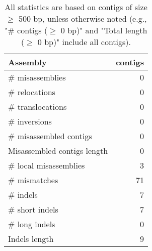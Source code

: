 \documentclass[12pt,a4paper]{article}
\begin{document}
\begin{table}[ht]
\begin{center}
\caption{All statistics are based on contigs of size $\geq$ 500 bp, unless otherwise noted (e.g., "\# contigs ($\geq$ 0 bp)" and "Total length ($\geq$ 0 bp)" include all contigs).}
\begin{tabular}{|l*{1}{|r}|}
\hline
Assembly & contigs \\ \hline
\# misassemblies & 0 \\ \hline
\hspace{5mm}\# relocations & 0 \\ \hline
\hspace{5mm}\# translocations & 0 \\ \hline
\hspace{5mm}\# inversions & 0 \\ \hline
\# misassembled contigs & 0 \\ \hline
Misassembled contigs length & 0 \\ \hline
\# local misassemblies & 3 \\ \hline
\# mismatches & 71 \\ \hline
\# indels & 7 \\ \hline
\hspace{5mm}\# short indels & 7 \\ \hline
\hspace{5mm}\# long indels & 0 \\ \hline
Indels length & 9 \\ \hline
\end{tabular}
\end{center}
\end{table}
\end{document}
